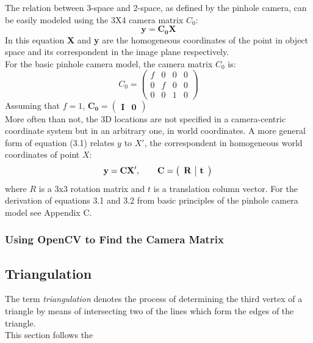 \documentclass[12pt,a4paper,twoside,openright]{report}
\begin{document}
\linebreak
The relation between 3-space and 2-space, as defined by the pinhole camera, can be easily modeled using the 3X4 camera matrix \textbf{$C_{0}$}: 
\begin{equation}
\mathbf{y = C_{0}X}
\end{equation}
In this equation \textbf{X} and \textbf{y} are the homogeneous coordinates of the point in object space and its correspondent in the image plane respectively.\\
For the basic pinhole camera model, the camera matrix $C_{0}$ is:
\[ C_{0}=\left(\begin{array}{cccc}
f & 0 & 0 & 0 \\
0 & f & 0 & 0 \\
0 & 0 & 1 & 0\end{array} \right)\]
Assuming that $f = 1$, $\mathbf{C_{0}} = \left ( \begin{array} {c|c} \mathbf{I} & \mathbf{0} \end{array} \right )$
\\
\linebreak
More often than not, the 3D locations are not specified in a camera-centric coordinate system but in an arbitrary one, in world coordinates. A more general form of equation (3.1) relates $y$ to $X'$, the correspondent in homogeneous world coordinates of point $X$:
\begin{equation}
\mathbf{y = CX'},\hspace{20pt} \mathbf{C} = \left ( \begin{array} {c|c} \mathbf{R} & \mathbf{t} \end{array} \right )\\
\end{equation} where $R$ is a 3x3 rotation matrix and $t$ is a translation column vector. For the derivation of equations 3.1 and 3.2 from basic principles of the pinhole camera model see Appendix C.\\

\subsubsection{Using OpenCV to Find the Camera Matrix}
\cite{baggio2012mastering}

\subsection{Triangulation}
The term \emph{triangulation} denotes the process of determining the third vertex of a triangle by means of intersecting two of the lines which form the edges of the triangle.\\
This section follows the 
\end{document}
